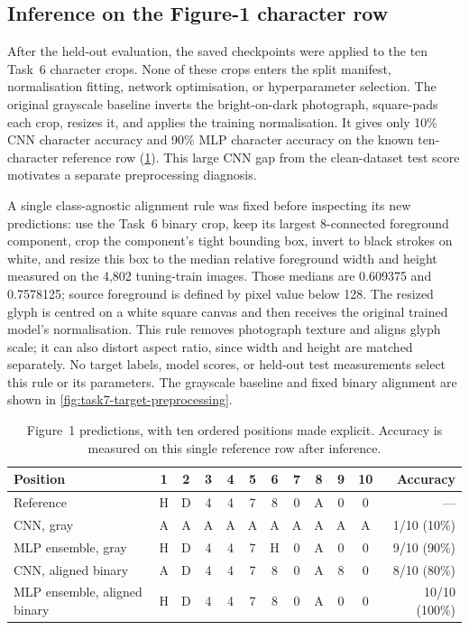 \subsection{Inference on the Figure-1 character row}

After the held-out evaluation, the saved checkpoints were applied to the ten
Task~6 character crops.  None of these crops enters the split manifest,
normalisation fitting, network optimisation, or hyperparameter selection.
The original grayscale baseline inverts the bright-on-dark photograph,
square-pads each crop, resizes it, and applies the training normalisation.
It gives only 10\% CNN character accuracy and 90\% MLP character accuracy
on the known ten-character reference row (\cref{tab:task7-target}).  This
large CNN gap from the clean-dataset test score motivates a separate
preprocessing diagnosis.

A single class-agnostic alignment rule was fixed before inspecting its new
predictions: use the Task~6 binary crop, keep its largest 8-connected
foreground component, crop the component's tight bounding box, invert to
black strokes on white, and resize this box to the median relative
foreground width and height measured on the 4,802 tuning-train images.
Those medians are 0.609375 and 0.7578125; source foreground is defined by
pixel value below 128.  The resized glyph is centred on a white square canvas
and then receives the original trained model's normalisation.  This rule
removes photograph texture and aligns glyph scale; it can also distort aspect
ratio, since width and height are matched separately.  No target labels,
model scores, or held-out test measurements select this rule or its parameters.
The grayscale baseline and fixed binary alignment are shown in
\cref{fig:task7-target-preprocessing}.

\begin{table}[!htbp]
  \centering
  \caption{Figure~1 predictions, with ten ordered positions made explicit.
  Accuracy is measured on this single reference row after inference.}
  \label{tab:task7-target}
  \setlength{\tabcolsep}{4pt}
  \begin{tabularx}{\linewidth}{@{}>{\raggedright\arraybackslash}X*{10}{c}r@{}}
    \toprule
    Position & 1 & 2 & 3 & 4 & 5 & 6 & 7 & 8 & 9 & 10 & Accuracy \\
    \midrule
    Reference & H & D & 4 & 4 & 7 & 8 & 0 & A & 0 & 0 & --- \\
    CNN, gray & A & A & A & A & A & A & A & A & A & A & 1/10 (10\%) \\
    MLP ensemble, gray & H & D & 4 & 4 & 7 & H & 0 & A & 0 & 0 & 9/10 (90\%) \\
    CNN, aligned binary & A & D & 4 & 4 & 7 & 8 & 0 & A & 8 & 0 & 8/10 (80\%) \\
    MLP ensemble, aligned binary & H & D & 4 & 4 & 7 & 8 & 0 & A & 0 & 0 & 10/10 (100\%) \\
    \bottomrule
  \end{tabularx}
\end{table}

